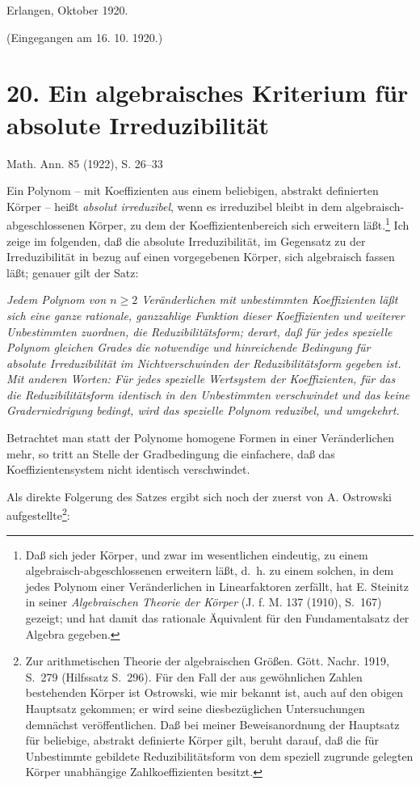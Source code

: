 \documentclass[11pt]{article}
\begin{document}
\begin{flushleft}
Erlangen, Oktober 1920.
\end{flushleft}
\begin{center}
(Eingegangen am 16. 10. 1920.)
\end{center}

\setcounter{footnote}{0}
\section*{20. Ein algebraisches Kriterium für absolute Irreduzibilität}
\begin{center}
Math. Ann. 85 (1922), S. 26--33
\end{center}

Ein Polynom -- mit Koeffizienten aus einem beliebigen, abstrakt definierten Körper -- heißt \emph{absolut irreduzibel}, wenn es irreduzibel bleibt in dem algebraisch-abgeschlossenen Körper, zu dem der Koeffizientenbereich sich erweitern läßt.\footnote{Daß sich jeder Körper, und zwar im wesentlichen eindeutig, zu einem algebraisch-abgeschlossenen erweitern läßt, d.~h. zu einem solchen, in dem jedes Polynom einer Veränderlichen in Linearfaktoren zerfällt, hat E. Steinitz in seiner \emph{Algebraischen Theorie der Körper} (J. f. M. 137 (1910), S.~167) gezeigt; und hat damit das rationale Äquivalent für den Fundamentalsatz der Algebra gegeben.} Ich zeige im folgenden, daß die absolute Irreduzibilität, im Gegensatz zu der Irreduzibilität in bezug auf einen vorgegebenen Körper, sich algebraisch fassen läßt; genauer gilt der Satz:

\emph{Jedem Polynom von $n\ge2$ Veränderlichen mit unbestimmten Koeffizienten läßt sich eine ganze rationale, ganzzahlige Funktion dieser Koeffizienten und weiterer Unbestimmten zuordnen, die Reduzibilitätsform; derart, daß für jedes spezielle Polynom gleichen Grades die notwendige und hinreichende Bedingung für absolute Irreduzibilität im Nichtverschwinden der Reduzibilitätsform gegeben ist. Mit anderen Worten: Für jedes spezielle Wertsystem der Koeffizienten, für das die Reduzibilitätsform identisch in den Unbestimmten verschwindet und das keine Graderniedrigung bedingt, wird das spezielle Polynom reduzibel, und umgekehrt.}

Betrachtet man statt der Polynome homogene Formen in einer Veränderlichen mehr, so tritt an Stelle der Gradbedingung die einfachere, daß das Koeffizientensystem nicht identisch verschwindet.

Als direkte Folgerung des Satzes ergibt sich noch der zuerst von A. Ostrowski aufgestellte\footnote{Zur arithmetischen Theorie der algebraischen Größen. Gött. Nachr. 1919, S.~279 (Hilfssatz S.~296). Für den Fall der aus gewöhnlichen Zahlen bestehenden Körper ist Ostrowski, wie mir bekannt ist, auch auf den obigen Hauptsatz gekommen; er wird seine diesbezüglichen Untersuchungen demnächst veröffentlichen. Daß bei meiner Beweisanordnung der Hauptsatz für beliebige, abstrakt definierte Körper gilt, beruht darauf, daß die für Unbestimmte gebildete Reduzibilitätsform von dem speziell zugrunde gelegten Körper unabhängige Zahlkoeffizienten besitzt.}:
\end{document}
